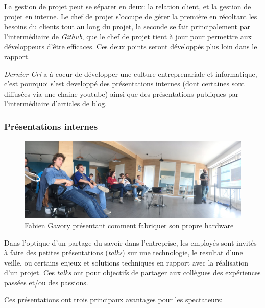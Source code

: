\documentclass[12pt,a4paper]{article}
\begin{document}
  \bigskip

  La gestion de projet peut se séparer en deux: la relation client, et la
  gestion de projet en interne. Le chef de projet s'occupe de gérer la
  première en récoltant les besoins du clients tout au long du projet, la
  seconde se fait principalement par l'intermédiaire de \emph{Github}, que
  le chef de projet tient à jour pour permettre aux développeurs d'être
  efficaces. Ces deux points seront développés plus loin dans le rapport.

  \bigskip

  \emph{Dernier Cri} a à coeur de développer une culture entreprenariale
  et informatique, c'est pourquoi s'est developpé des présentations
  internes (dont certaines sont diffusées via une chaine youtube) ainsi
  que des présentations publiques par l'intermédiaire d'articles de blog.

  \subsubsection{Présentations internes}\label{pruxe9sentations-internes}

  \begin{figure}[h]
    \centering
    \includegraphics[height=4cm]{figures/talk.jpg}
    \caption{Fabien Gavory présentant comment fabriquer son propre hardware}
  \end{figure}

  \bigskip

  Dans l'optique d'un partage du savoir dans l'entreprise, les employés
  sont invités à faire des petites présentations (\emph{talks}) sur une
  technologie, le resultat d'une veille, ou certains enjeux et solutions
  techniques en rapport avec la réalisation d'un projet. Ces \emph{talks}
  ont pour objectifs de partager aux collègues des expériences passées
  et/ou des passions.

  \bigskip

  Ces présentations ont trois principaux avantages pour les spectateurs:
\end{document}
